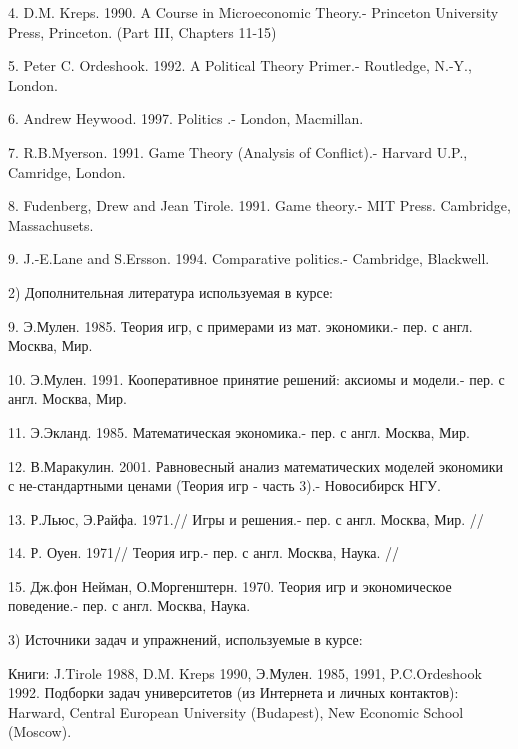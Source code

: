 \documentclass[a4paper,12pt]{article}
\begin{document}
4. D.M. Kreps. 1990.  A Course in Microeconomic
Theory.- Princeton University Press,   Princeton.
(Part III, Chapters 11-15)

5. Peter C. Ordeshook. 1992. A Political Theory 
Primer.- Routledge, N.-Y., London.

6. Andrew Heywood. 1997. Politics .- London, Macmillan.

7. R.B.Myerson. 1991. Game Theory (Analysis of
Conflict).- Harvard U.P., Camridge, London.

8.  Fudenberg, Drew and Jean Tirole. 1991. Game
theory.- MIT Press.       Cambridge, Massachusets.

9. J.-E.Lane and S.Ersson. 1994. Comparative
politics.- Cambridge, Blackwell.

2) Дополнительная литература используемая в курсе:

9. Э.Мулен. 1985. Теория игр, с примерами из мат.
экономики.- пер. с англ. Москва, Мир.

10. Э.Мулен. 1991. Кооперативное принятие решений:
аксиомы и модели.- пер. с англ. Москва, Мир.

11. Э.Экланд. 1985. Математическая экономика.- пер.
с англ. Москва, Мир.

12. В.Маракулин. 2001. Равновесный анализ
математических моделей экономики с не-стандартными
ценами (Теория игр - часть 3).- Новосибирск НГУ.

13. Р.Льюс, Э.Райфа. 1971.// Игры и решения.- пер.
с англ. Москва, Мир. //

14. Р. Оуен. 1971// Теория игр.- пер. с англ.
Москва, Наука. //

15. Дж.фон Нейман, О.Моргенштерн. 1970. Теория игр
и экономическое поведение.- пер. с англ. Москва,
Наука.

3) Источники задач и упражнений, используемые в
курсе:

Книги: J.Tirole 1988, D.M. Kreps 1990, Э.Мулен.
1985, 1991, P.C.Ordeshook 1992. Подборки задач
университетов (из Интернета и личных контактов):
Harward, Central European University (Budapest),
New Economic School (Moscow).
\end{document}
